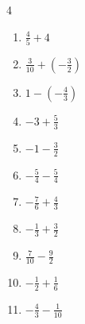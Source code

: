 \begin{multicols}{4}
\begin{enumerate}

  \item $\displaystyle \frac{4}{5} + 4$


  \item $\displaystyle \frac{3}{10} + \left(-\frac{3}{2}\right)$


  \item $\displaystyle 1 - \left(-\frac{4}{3}\right)$


  \item $\displaystyle -3 + \frac{5}{3}$


  \item $\displaystyle -1 - \frac{3}{2}$


  \item $\displaystyle -\frac{5}{4} - \frac{5}{4}$


  \item $\displaystyle -\frac{7}{6} + \frac{4}{3}$


  \item $\displaystyle -\frac{1}{3} + \frac{3}{2}$


  \item $\displaystyle \frac{7}{10} - \frac{9}{2}$


\columnbreak %

\resetques

  \item $\displaystyle -\frac{1}{2} + \frac{1}{6}$


  \item $\displaystyle -\frac{4}{3} - \frac{1}{10}$



\end{enumerate}
\end{multicols}
